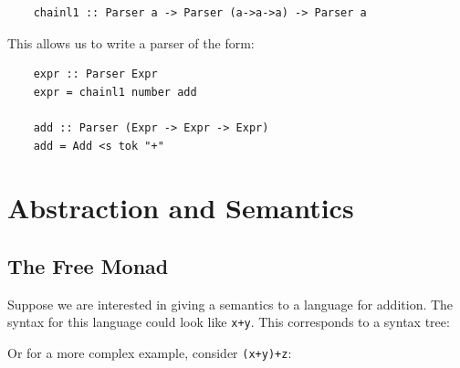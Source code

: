 \documentclass[a4paper,12pt]{article}
\theoremstyle{remark}
\begin{document}
\begin{lstlisting}
    chainl1 :: Parser a -> Parser (a->a->a) -> Parser a  \end{lstlisting}

This allows us to write a parser of the form:

\begin{lstlisting}
    expr :: Parser Expr
    expr = chainl1 number add

    add :: Parser (Expr -> Expr -> Expr)
    add = Add <s tok "+"  \end{lstlisting}

\section{Abstraction and Semantics}

\subsection{The Free Monad}

Suppose we are interested in giving a semantics to a language for addition. The
syntax for this language could look like \lstinline{x+y}. This corresponds
to a syntax tree:

\begin{figure}[H]
  \centering
\end{figure}

Or for a more complex example, consider \lstinline{(x+y)+z}:

\begin{figure}[H]
  \centering
\end{figure}
\end{document}
